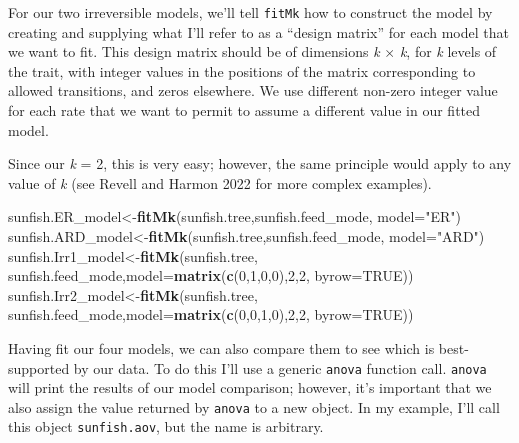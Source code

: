 \documentclass[fleqn,10pt,lineno]{wlpeerj} %
\newenvironment{Shaded}{\begin{snugshade}}{\end{snugshade}}
\newcommand{\AttributeTok}[1]{\textcolor[rgb]{0.13,0.29,0.53}{#1}}
\newcommand{\ConstantTok}[1]{\textcolor[rgb]{0.56,0.35,0.01}{#1}}
\newcommand{\DecValTok}[1]{\textcolor[rgb]{0.00,0.00,0.81}{#1}}
\newcommand{\FunctionTok}[1]{\textcolor[rgb]{0.13,0.29,0.53}{\textbf{#1}}}
\newcommand{\NormalTok}[1]{#1}
\newcommand{\OtherTok}[1]{\textcolor[rgb]{0.56,0.35,0.01}{#1}}
\newcommand{\StringTok}[1]{\textcolor[rgb]{0.31,0.60,0.02}{#1}}
\begin{document}
For our two irreversible models, we'll tell \texttt{fitMk} how to construct the model by creating and supplying what I'll refer to as a ``design matrix'' for each model that we want to fit. This design matrix should be of dimensions \emph{k} \(\times\) \emph{k}, for \emph{k} levels of the trait, with integer values in the positions of the matrix corresponding to allowed transitions, and zeros elsewhere. We use different non-zero integer value for each rate that we want to permit to assume a different value in our fitted model.

Since our \emph{k} = 2, this is very easy; however, the same principle would apply to any value of \emph{k} (see Revell and Harmon 2022 for more complex examples).

\begin{Shaded}
\begin{Highlighting}[]
\NormalTok{sunfish.ER\_model}\OtherTok{\textless{}{-}}\FunctionTok{fitMk}\NormalTok{(sunfish.tree,sunfish.feed\_mode,}
  \AttributeTok{model=}\StringTok{"ER"}\NormalTok{)}
\NormalTok{sunfish.ARD\_model}\OtherTok{\textless{}{-}}\FunctionTok{fitMk}\NormalTok{(sunfish.tree,sunfish.feed\_mode,}
  \AttributeTok{model=}\StringTok{"ARD"}\NormalTok{)}
\NormalTok{sunfish.Irr1\_model}\OtherTok{\textless{}{-}}\FunctionTok{fitMk}\NormalTok{(sunfish.tree,}
\NormalTok{  sunfish.feed\_mode,}\AttributeTok{model=}\FunctionTok{matrix}\NormalTok{(}\FunctionTok{c}\NormalTok{(}\DecValTok{0}\NormalTok{,}\DecValTok{1}\NormalTok{,}\DecValTok{0}\NormalTok{,}\DecValTok{0}\NormalTok{),}\DecValTok{2}\NormalTok{,}\DecValTok{2}\NormalTok{,}
  \AttributeTok{byrow=}\ConstantTok{TRUE}\NormalTok{))}
\NormalTok{sunfish.Irr2\_model}\OtherTok{\textless{}{-}}\FunctionTok{fitMk}\NormalTok{(sunfish.tree,}
\NormalTok{  sunfish.feed\_mode,}\AttributeTok{model=}\FunctionTok{matrix}\NormalTok{(}\FunctionTok{c}\NormalTok{(}\DecValTok{0}\NormalTok{,}\DecValTok{0}\NormalTok{,}\DecValTok{1}\NormalTok{,}\DecValTok{0}\NormalTok{),}\DecValTok{2}\NormalTok{,}\DecValTok{2}\NormalTok{,}
  \AttributeTok{byrow=}\ConstantTok{TRUE}\NormalTok{))}
\end{Highlighting}
\end{Shaded}

Having fit our four models, we can also compare them to see which is best-supported by our data. To do this I'll use a generic \texttt{anova} function call. \texttt{anova} will print the results of our model comparison; however, it's important that we also assign the value returned by \texttt{anova} to a new object. In my example, I'll call this object \texttt{sunfish.aov}, but the name is arbitrary.
\end{document}
